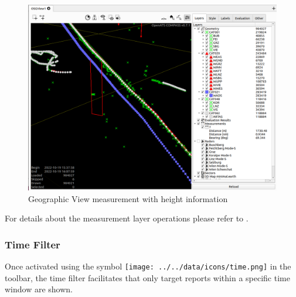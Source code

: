 \begin{figure}[H]
    \hspace*{-2.5cm}
    \includegraphics[width=19cm,frame]{figures/geoview_measure3d.png}
  \caption{Geographic View measurement with height information}
\end{figure}


For details about the measurement layer operations please refer to . \\





\subsubsection{Time Filter}

Once activated using the symbol \texttt{[image: ../../data/icons/time.png]} in the toolbar, the time filter facilitates that only target reports within a specific time window are shown.


